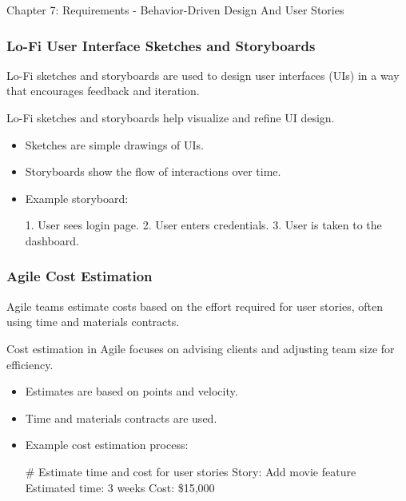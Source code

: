 \begin{notes}{Chapter 7: Requirements - Behavior-Driven Design And User Stories}
\begin{highlight}
    \end{highlight}
    
    \subsubsection*{Lo-Fi User Interface Sketches and Storyboards}
    
    Lo-Fi sketches and storyboards are used to design user interfaces (UIs) in a way that encourages feedback and iteration.
    
    \begin{highlight}
    
        Lo-Fi sketches and storyboards help visualize and refine UI design.
        
        \begin{itemize}
            \item Sketches are simple drawings of UIs.
            \item Storyboards show the flow of interactions over time.
            \item Example storyboard:
    \begin{code}[Bash]
    1. User sees login page.
    2. User enters credentials.
    3. User is taken to the dashboard.
    \end{code}
        \end{itemize}
    
    \end{highlight}
    
    \subsubsection*{Agile Cost Estimation}
    
    Agile teams estimate costs based on the effort required for user stories, often using time and materials contracts.
    
    \begin{highlight}
    
        Cost estimation in Agile focuses on advising clients and adjusting team size for efficiency.
        
        \begin{itemize}
            \item Estimates are based on points and velocity.
            \item Time and materials contracts are used.
            \item Example cost estimation process:
    \begin{code}[Bash]
    # Estimate time and cost for user stories
    Story: Add movie feature
    Estimated time: 3 weeks
    Cost: \$15,000
    \end{code}
        \end{itemize}
    

\end{highlight}
\end{notes}
